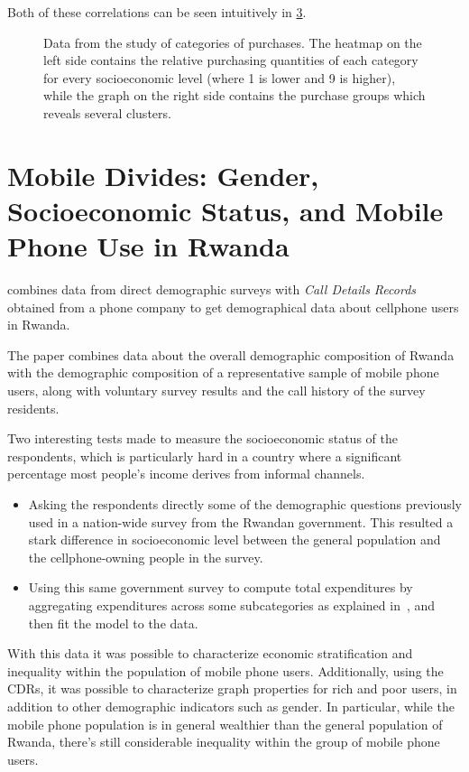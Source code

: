 Both of these correlations can be seen intuitively in \cref{fig:paper_yannick}.

\begin{figure}
\centering
\begin{subfigure}[t]{.45\textwidth}
\label{fig:service_socioeconomic}
\end{subfigure}
\begin{subfigure}[t]{.45\textwidth}
\label{fig:service_service}
\end{subfigure}
\caption{Data from the study of categories of purchases. The heatmap on the left side contains the relative purchasing quantities of each category for every socioeconomic level (where 1 is lower and 9 is higher), while the graph on the right side contains the purchase groups which reveals several clusters. }
\label{fig:paper_yannick}
\end{figure}

\section{Mobile Divides: Gender, Socioeconomic Status, and Mobile Phone Use in Rwanda}

\cite{blumenstock2010mobile} combines data from direct demographic surveys with \emph{Call Details Records} obtained from a phone company to get demographical data about cellphone users in Rwanda.

The paper combines data about the overall demographic composition of Rwanda with the demographic composition of a representative sample of mobile phone users, along with voluntary survey results and the call history of the survey residents.

Two interesting tests made to measure the socioeconomic status of the respondents, which is particularly hard in a country where a significant percentage most people's income derives from informal channels.

\begin{itemize}
	\item Asking the respondents directly some of the demographic questions previously used in a nation-wide survey from the Rwandan government. This resulted a stark difference in socioeconomic level between the general population and the cellphone-owning people in the survey.
	\item Using this same government survey to compute total expenditures by aggregating expenditures across some subcategories as explained in~\cite{deaton2002}, and then fit the model to the data.
\end{itemize}

With this data it was possible to characterize economic stratification and inequality within the population of mobile phone users. Additionally, using the CDRs, it was possible to characterize graph properties for rich and poor users, in addition to other demographic indicators such as gender. In particular, while the mobile phone population is in general wealthier than the general population of Rwanda, there's still considerable inequality within the group of mobile phone users.
